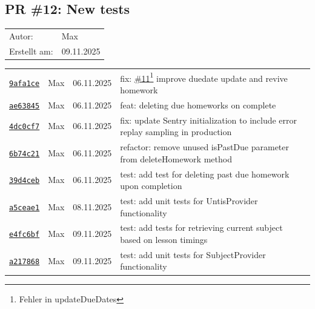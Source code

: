 \documentclass{article}%
\begin{document}
\subsection{PR \#12: New tests}%
\label{pr:12}%
\begin{tabular}{l l}%
Autor:&Max\\%
Erstellt am: &09.11.2025\\%
\end{tabular}%
\begin{longtable}{l l l p{12cm}}%
\href{https://github.com/scriptor1000/homeworks/pull/12/commits/9afa1cecce0cb1c654137dc600331fdbcc7f5eb0}{\underline{\texttt{9afa1ce}}}&Max&06.11.2025&fix: \href{https://github.com/scriptor1000/homeworks/issues/11}{\underline{\#11}}\footnote{Fehler in updateDueDates} improve duedate update and revive homework\\%
\href{https://github.com/scriptor1000/homeworks/pull/12/commits/ae63845e65a54b24f774c34c3721526a7361985b}{\underline{\texttt{ae63845}}}&Max&06.11.2025&feat: deleting due homeworks on complete\\%
\href{https://github.com/scriptor1000/homeworks/pull/12/commits/4dc0cf73dc7d7aecd3b2814c2e4569754ad11c4f}{\underline{\texttt{4dc0cf7}}}&Max&06.11.2025&fix: update Sentry initialization to include error replay sampling in production\\%
\href{https://github.com/scriptor1000/homeworks/pull/12/commits/6b74c214853aa00cf70acaeb24620f4fcfe77238}{\underline{\texttt{6b74c21}}}&Max&06.11.2025&refactor: remove unused isPastDue parameter from deleteHomework method\\%
\href{https://github.com/scriptor1000/homeworks/pull/12/commits/39d4ceba1aaed555ae64db2658ba8ee531dbe0d9}{\underline{\texttt{39d4ceb}}}&Max&06.11.2025&test: add test for deleting past due homework upon completion\\%
\href{https://github.com/scriptor1000/homeworks/pull/12/commits/a5ceae133959f2b1e42667e79ef455a86979f10f}{\underline{\texttt{a5ceae1}}}&Max&08.11.2025&test: add unit tests for UntisProvider functionality\\%
\href{https://github.com/scriptor1000/homeworks/pull/12/commits/e4fc6bfce9dfb678be75ed4f75d2780a2e17b74f}{\underline{\texttt{e4fc6bf}}}&Max&09.11.2025&test: add tests for retrieving current subject based on lesson timings\\%
\href{https://github.com/scriptor1000/homeworks/pull/12/commits/a217868ebf108c75d8d40db225174c5f124e107c}{\underline{\texttt{a217868}}}&Max&09.11.2025&test: add unit tests for SubjectProvider functionality\\%

\end{longtable}
\end{document}
